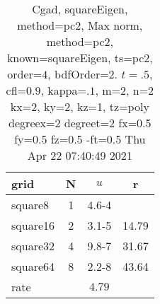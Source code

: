 \begin{table}[H]\tableFont %
\begin{center}
\begin{tabular}{|l|c|c|c|} \hline 
grid  & N &  $ u $ & r \\ \hline 
   square8 &     1 & \num{4.6}{-4} &        \\ \hline
  square16 &     2 & \num{3.1}{-5} & 14.79  \\ \hline
  square32 &     4 & \num{9.8}{-7} & 31.67  \\ \hline
  square64 &     8 & \num{2.2}{-8} & 43.64  \\ \hline
    rate             &       &  $4.79$       &       \\ \hline
\end{tabular}
\caption{Cgad, squareEigen, method=pc2, Max norm, method=pc2, known=squareEigen, ts=pc2, order=$4$, bdfOrder=2. $t=.5$, cfl=$0.9$, kappa=$.1$, m=2, n=2 kx=2, ky=2, kz=1,  tz=poly degreex=2 degreet=2 fx=0.5 fy=0.5 fz=0.5 -ft=0.5 Thu Apr 22 07:40:49 2021}\label{table:squareEigenpc2Order4Max}
\end{center}
\end{table}
